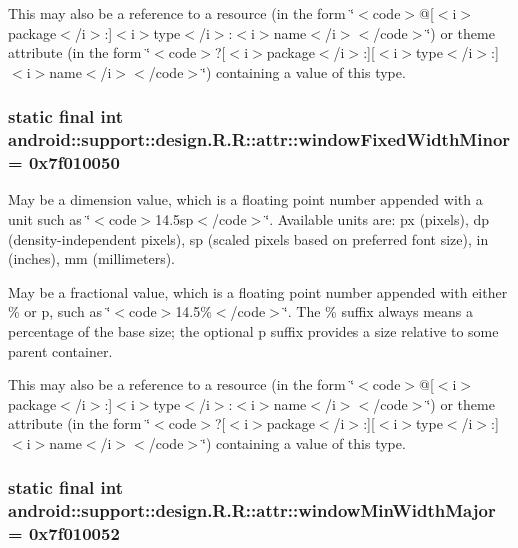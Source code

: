This may also be a reference to a resource (in the form \char`\"{}$<$code$>$@\mbox{[}$<$i$>$package$<$/i$>$:\mbox{]}$<$i$>$type$<$/i$>$:$<$i$>$name$<$/i$>$$<$/code$>$\char`\"{}) or theme attribute (in the form \char`\"{}$<$code$>$?\mbox{[}$<$i$>$package$<$/i$>$:\mbox{]}\mbox{[}$<$i$>$type$<$/i$>$:\mbox{]}$<$i$>$name$<$/i$>$$<$/code$>$\char`\"{}) containing a value of this type. \hypertarget{classandroid_1_1support_1_1design_1_1_r_1_1attr_7ad985a7157b1c7adf744c9104980da1}{
\subsubsection[{windowFixedWidthMinor}]{\setlength{\rightskip}{0pt plus 5cm}static final int android::support::design.R.R::attr::windowFixedWidthMinor = 0x7f010050}}
\label{classandroid_1_1support_1_1design_1_1_r_1_1attr_7ad985a7157b1c7adf744c9104980da1}


May be a dimension value, which is a floating point number appended with a unit such as \char`\"{}$<$code$>$14.5sp$<$/code$>$\char`\"{}. Available units are: px (pixels), dp (density-independent pixels), sp (scaled pixels based on preferred font size), in (inches), mm (millimeters). 

May be a fractional value, which is a floating point number appended with either \% or p, such as \char`\"{}$<$code$>$14.5\%$<$/code$>$\char`\"{}. The \% suffix always means a percentage of the base size; the optional p suffix provides a size relative to some parent container. 

This may also be a reference to a resource (in the form \char`\"{}$<$code$>$@\mbox{[}$<$i$>$package$<$/i$>$:\mbox{]}$<$i$>$type$<$/i$>$:$<$i$>$name$<$/i$>$$<$/code$>$\char`\"{}) or theme attribute (in the form \char`\"{}$<$code$>$?\mbox{[}$<$i$>$package$<$/i$>$:\mbox{]}\mbox{[}$<$i$>$type$<$/i$>$:\mbox{]}$<$i$>$name$<$/i$>$$<$/code$>$\char`\"{}) containing a value of this type. \hypertarget{classandroid_1_1support_1_1design_1_1_r_1_1attr_be157dea2a1ee83c5c37ea2debc9980b}{
\subsubsection[{windowMinWidthMajor}]{\setlength{\rightskip}{0pt plus 5cm}static final int android::support::design.R.R::attr::windowMinWidthMajor = 0x7f010052}}
\label{classandroid_1_1support_1_1design_1_1_r_1_1attr_be157dea2a1ee83c5c37ea2debc9980b}


